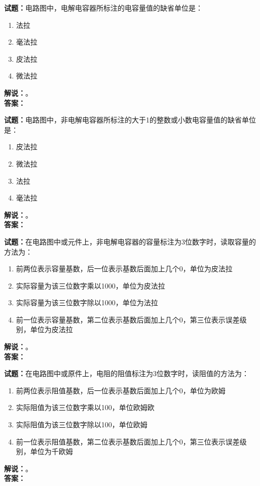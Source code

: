 \documentclass{ctexbook}
\begin{document}
\noindent\textbf{试题：}电路图中，电解电容器所标注的电容量值的缺省单位是：
\begin{enumerate}[leftmargin=3em]
  \item 法拉
  \item 毫法拉
  \item 皮法拉
  \item 微法拉
\end{enumerate}
\noindent\textbf{解说：}\textbf{}。\\\noindent\textbf{答案：}

\bigskip

\noindent\textbf{试题：}电路图中，非电解电容器所标注的大于1的整数或小数电容量值的缺省单位是：
\begin{enumerate}[leftmargin=3em]
  \item 皮法拉
  \item 微法拉
  \item 法拉
  \item 毫法拉
\end{enumerate}
\noindent\textbf{解说：}\textbf{}。\\\noindent\textbf{答案：}

\bigskip

\noindent\textbf{试题：}在电路图中或元件上，非电解电容器的容量标注为3位数字时，读取容量的方法为：
\begin{enumerate}[leftmargin=3em]
  \item 前两位表示容量基数，后一位表示基数后面加上几个0，单位为皮法拉
  \item 实际容量为该三位数字乘以1000，单位为皮法拉
  \item 实际容量为该三位数字除以1000，单位为法拉
  \item 前一位表示容量基数，第二位表示基数后面加上几个0，第三位表示误差级别，单位为皮法拉
\end{enumerate}
\noindent\textbf{解说：}\textbf{}。\\\noindent\textbf{答案：}

\bigskip

\noindent\textbf{试题：}在电路图中或原件上，电阻的阻值标注为3位数字时，读阻值的方法为：
\begin{enumerate}[leftmargin=3em]
  \item 前两位表示阻值基数，后一位表示基数后面加上几个0，单位为欧姆
  \item 实际阻值为该三位数字乘以100，单位欧姆欧
  \item 实际阻值为该三位数字除以100，单位欧姆
  \item 前一位表示阻值基数，第二位表示基数后面加上几个0，第三位表示误差级别，单位为千欧姆
\end{enumerate}
\noindent\textbf{解说：}\textbf{}。\\\noindent\textbf{答案：}
\end{document}
